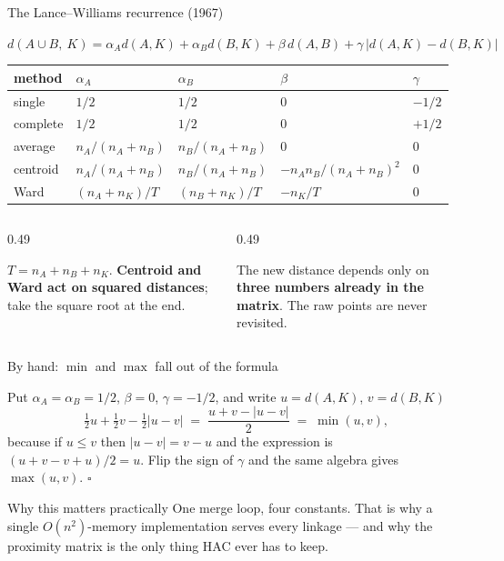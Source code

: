 \documentclass[aspectratio=169]{beamer}
\begin{document}
\begin{frame}[shrink=14]{The Lance--Williams recurrence (1967)}
  \begin{exampleblock}{}
    \centering\large
    $d(A \cup B,\ K) = \alpha_A d(A,K) + \alpha_B d(B,K) + \beta\, d(A,B)
      + \gamma\,\bigl|d(A,K) - d(B,K)\bigr|$
  \end{exampleblock}
  \begin{center}\small
  \begin{tabular}{lllll}
    \toprule
    method & $\alpha_A$ & $\alpha_B$ & $\beta$ & $\gamma$ \\
    \midrule
    single   & $1/2$ & $1/2$ & $0$ & $-1/2$ \\
    complete & $1/2$ & $1/2$ & $0$ & $+1/2$ \\
    average  & $n_A/(n_A{+}n_B)$ & $n_B/(n_A{+}n_B)$ & $0$ & $0$ \\
    centroid & $n_A/(n_A{+}n_B)$ & $n_B/(n_A{+}n_B)$ &
               $-n_A n_B/(n_A{+}n_B)^2$ & $0$ \\
    Ward     & $(n_A{+}n_K)/T$ & $(n_B{+}n_K)/T$ & $-n_K/T$ & $0$ \\
    \bottomrule
  \end{tabular}
  \end{center}
  \begin{columns}[T]
    \begin{column}{0.49\textwidth}
      \begin{block}{}
        \small $T = n_A + n_B + n_K$. \textbf{Centroid and Ward act on
        squared distances}; take the square root at the end.
      \end{block}
    \end{column}
    \begin{column}{0.49\textwidth}
      \begin{alertblock}{}
        \small The new distance depends only on \textbf{three numbers already
        in the matrix}. The raw points are never revisited.
      \end{alertblock}
    \end{column}
  \end{columns}
\end{frame}

\begin{frame}[shrink=3]{By hand: $\min$ and $\max$ fall out of the formula}
  \begin{block}{Put $\alpha_A = \alpha_B = 1/2$, $\beta = 0$, $\gamma = -1/2$, and write $u = d(A,K)$, $v = d(B,K)$}
    \[
      \tfrac12 u + \tfrac12 v - \tfrac12|u - v|
      \;=\; \frac{u + v - |u-v|}{2} \;=\; \min(u, v),
    \]
    because if $u \le v$ then $|u-v| = v - u$ and the expression is
    $(u + v - v + u)/2 = u$. Flip the sign of $\gamma$ and the same algebra
    gives $\max(u,v)$. \ensuremath{\square}
  \end{block}
  \begin{alertblock}{Why this matters practically}
    \centering
    One merge loop, four constants. That is why a single $O(n^2)$-memory
    implementation serves every linkage --- and why the proximity matrix is
    the only thing HAC ever has to keep.
  \end{alertblock}
\end{frame}
\end{document}
